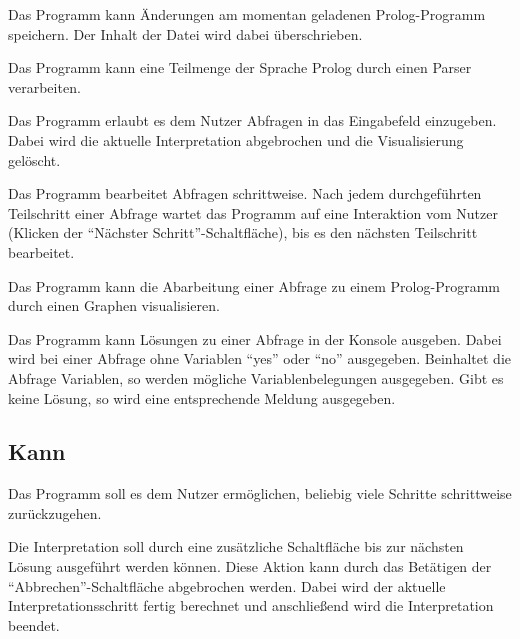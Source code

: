 \documentclass[parskip=full,11pt,twoside]{scrartcl}
\begin{document}

Das Programm kann Änderungen am momentan geladenen Prolog-Programm speichern. Der Inhalt der Datei wird dabei überschrieben.


Das Programm kann eine Teilmenge der Sprache Prolog durch einen Parser verarbeiten.


Das Programm erlaubt es dem Nutzer Abfragen in das Eingabefeld einzugeben. Dabei wird die aktuelle Interpretation abgebrochen und die Visualisierung gelöscht.


Das Programm bearbeitet Abfragen schrittweise. Nach jedem durchgeführten Teilschritt einer Abfrage wartet das Programm auf eine Interaktion vom Nutzer (Klicken der \enquote{Nächster Schritt}-Schaltfläche), bis es den nächsten Teilschritt bearbeitet.


Das Programm kann die Abarbeitung einer Abfrage zu einem Prolog-Programm durch einen Graphen visualisieren.


Das Programm kann Lösungen zu einer Abfrage in der Konsole ausgeben. Dabei wird bei einer Abfrage ohne Variablen \enquote{yes} oder \enquote{no} ausgegeben. Beinhaltet die Abfrage Variablen, so werden mögliche Variablenbelegungen ausgegeben. Gibt es keine Lösung, so wird eine entsprechende Meldung ausgegeben.

\subsection{Kann}


Das Programm soll es dem Nutzer ermöglichen, beliebig viele Schritte schrittweise zurückzugehen.


Die Interpretation soll durch eine zusätzliche Schaltfläche bis zur nächsten Lösung ausgeführt werden können. Diese Aktion kann durch das Betätigen der \enquote{Abbrechen}-Schaltfläche abgebrochen werden. Dabei wird der aktuelle Interpretationsschritt fertig berechnet und anschließend wird die Interpretation beendet.
\end{document}
